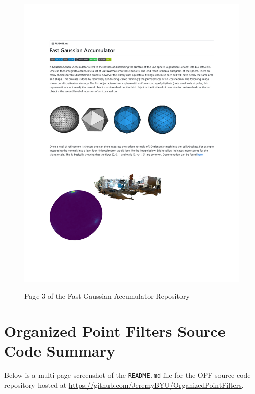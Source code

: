 \begin{figure}[h!]
    \centering\includegraphics[page=3, trim=1.0in 1.0in 1.0in 1.0in, width=.93\linewidth]{appendix_1/imgs/FastGAReadme.pdf}
    \label{fig:apx1_fg3}
    \caption{Page 3 of the Fast Gaussian Accumulator Repository} 
\end{figure}

\newpage

\section{Organized Point Filters Source Code Summary} 
Below is a multi-page screenshot of the \texttt{README.md} file for the OPF source code repository hosted at \url{https://github.com/JeremyBYU/OrganizedPointFilters}.

